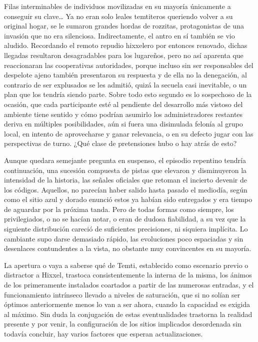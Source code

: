\documentclass[
]{book}
\begin{document}
Filas interminables de individuos movilizadas en su mayoría únicamente a conseguir su clave\ldots{} Ya no eran solo leales temtiteros queriendo volver a su original hogar, se le sumaron grandes hordas de rozzitas, protagonistas de una invasión que no era silenciosa. Indirectamente, el antro en sí también se vio aludido. Recordando el remoto repudio hixxelero por entonces renovado, dichas llegadas resultaron desagradables para los lugareños, pero no así aparenta que reaccionaran las cooperativas autoridades, porque incluso sin ser responsables del despelote ajeno también presentaron su respuesta y de ella no la denegación, al contrario de ser explusados se les admitió, quizá la secuela casi inevitable, o un plan que los tendría siendo parte. Sobre todo esto segundo es lo sospechoso de la ocasión, que cada participante esté al pendiente del desarrollo más vistoso del ambiente tiene sentido y cómo podrían asumirlo los administradores restantes deriva en múltiples posibilidades, aún si fuera una disimulada felonía al grupo local, en intento de aprovecharse y ganar relevancia, o en su defecto jugar con las perspectivas de turno. ¿Qué clase de pretensiones hubo o hay atrás de esto?

Aunque quedara semejante pregunta en suspenso, el episodio repentino tendría continuación, una sucesión compuesta de pistas que elevaron y disminuyeron la intensidad de la historia, las señales oficiales que retoman el incierto devenir de los códigos. Aquellos, no parecían haber salido hasta pasado el mediodía, según como el sitio azul y dorado enunció estos ya habían sido entregados y era tiempo de aguardar por la próxima tanda. Pero de todas formas como siempre, los privilegiados, o no se hacían notar, o eran de dudosa fiabilidad, a su vez que la siguiente distribución careció de suficientes precisiones, ni siquiera implícita. Lo cambiante supo darse demasiado rápido, las evoluciones poco espaciadas y sin desenlaces contundentes a la vista, no obstante muy convincentes en su mayoría.

La apertura o vaya a saberse qué de Temti, establecido como escenario previo o distractor a Hixxel, trastoca consistentemente la interna de la misma, los ánimos de los primeramente instalados coartados a partir de las numerosas entradas, y el funcionamiento intrínseco llevado a niveles de saturación, que si no solían ser óptimos anteriormente menos lo van a ser ahora, cuando la capacidad es exigida al máximo. Sin duda la conjugación de estas eventualidades trastorna la realidad presente y por venir, la configuración de los sitios implicados desordenada sin todavía concluir, hay varios factores que esperan actualizaciones.
\end{document}
